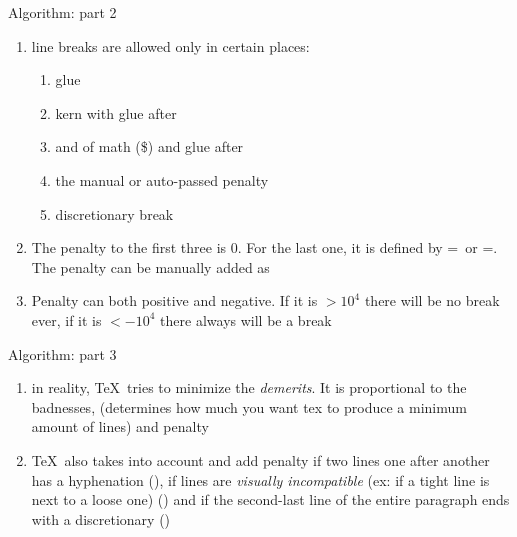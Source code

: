 \begin{frame}{Algorithm: part 2\magicPage}\relax

\begin{enumerate}
    \item line breaks are allowed only in certain places:
    \begin{enumerate}
        \item glue
        \item kern with glue after 
        \item and of math (\$) and glue after 
        \item the manual or auto-passed penalty
        \item  discretionary break
    \end{enumerate}
    \item The penalty to the first three is $0$. For the last one, it is defined by \ccol\hyphenpenalty=\ or \ccol\exhyphenpenalty=. The penalty can be manually added as \ccol\penalty
    \item Penalty can both positive and negative. If it is $>10^4$ there will be no break ever, if it is $<-10^4$ there always will be a break
     
\end{enumerate}
     
\end{frame}


\begin{frame}{Algorithm: part 3\magicPage}\relax

\begin{enumerate}
\item in reality, \TeX\ tries to minimize the \textit{demerits}. It is proportional to the {\csk badnesses}, \ccol\linepenalty (determines how much you want tex to produce a minimum amount of lines) and {\csk penalty}
\item \TeX\ also takes into account and add penalty if two lines one after another has a hyphenation (\ccol\doublehyphendemerits), if lines are \textit{visually incompatible} (ex: if a tight line is next to a loose one) (\ccol\adjdemerits) and if the second-last line of the entire paragraph ends with a discretionary (\ccol\finalhyphendemerits)

\end{enumerate}
     
\end{frame}

